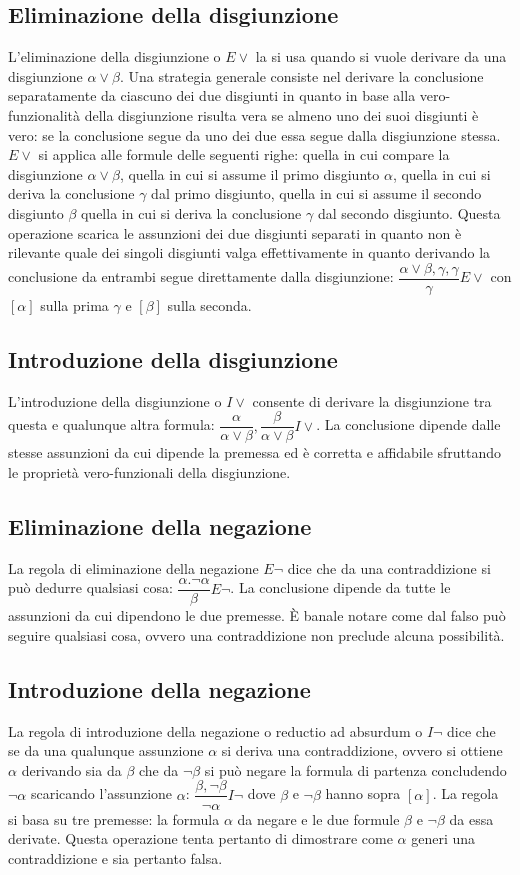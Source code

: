 \subsection{Eliminazione della disgiunzione}
L'eliminazione della disgiunzione o $E\lor$ la si usa quando si vuole derivare da una disgiunzione $\alpha\lor\beta$. Una strategia generale consiste nel derivare la conclusione separatamente da ciascuno dei 
due disgiunti in quanto in base alla vero-funzionalit\`a della disgiunzione risulta vera se almeno uno dei suoi disgiunti \`e vero: se la conclusione segue da uno dei due essa segue dalla disgiunzione stessa. 
$E\lor$ si applica alle formule delle seguenti righe: quella in cui compare la disgiunzione $\alpha\lor\beta$, quella in cui si assume il primo disgiunto $\alpha$, quella in cui si deriva la conclusione $\gamma$ 
dal primo disgiunto, quella in cui si assume il secondo disgiunto $\beta$ quella in cui si deriva la conclusione $\gamma$ dal secondo disgiunto. Questa operazione scarica le assunzioni dei due disgiunti separati 
in quanto non \`e rilevante quale dei singoli disgiunti valga effettivamente in quanto derivando la conclusione da entrambi segue direttamente dalla disgiunzione: $\dfrac{\alpha\lor\beta, \gamma, \gamma}
{\gamma}E\lor$ con $[\alpha]$ sulla prima $\gamma$ e $[\beta]$ sulla seconda.
\subsection{Introduzione della disgiunzione}
L'introduzione della disgiunzione o $I\lor$ consente di derivare la disgiunzione tra questa e qualunque altra formula: $\dfrac{\alpha}{\alpha\lor\beta},\dfrac{\beta}{\alpha\lor\beta}I\lor$. La conclusione 
dipende dalle stesse assunzioni da cui dipende la premessa ed \`e corretta e affidabile sfruttando le propriet\`a vero-funzionali della disgiunzione.
\subsection{Eliminazione della negazione}
La regola di eliminazione della negazione $E\neg$ dice che da una contraddizione si pu\`o dedurre qualsiasi cosa: $\dfrac{\alpha. \neg\alpha}{\beta}E\neg$. La conclusione dipende da tutte le assunzioni da cui 
dipendono le due premesse. \`E banale notare come dal falso pu\`o seguire qualsiasi cosa, ovvero una contraddizione non preclude alcuna possibilit\`a. 
\subsection{Introduzione della negazione}
La regola di introduzione della negazione o reductio ad absurdum o $I\neg$ dice che se da una qualunque assunzione $\alpha$ si deriva una contraddizione, ovvero si ottiene $\alpha$ derivando sia da $\beta$ 
che da $\neg\beta$ si pu\`o negare la formula di partenza concludendo $\neg\alpha$ scaricando l'assunzione $\alpha$: $\dfrac{\beta, \neg\beta}{\neg\alpha}I\neg$ dove $\beta$ e $\neg\beta$ hanno sopra $
[\alpha]$. La regola si basa su tre premesse: la formula $\alpha$ da negare e le due formule $\beta$ e $\neg\beta$ da essa derivate. Questa operazione tenta pertanto di dimostrare come $\alpha$ generi
una contraddizione e sia pertanto falsa. 
